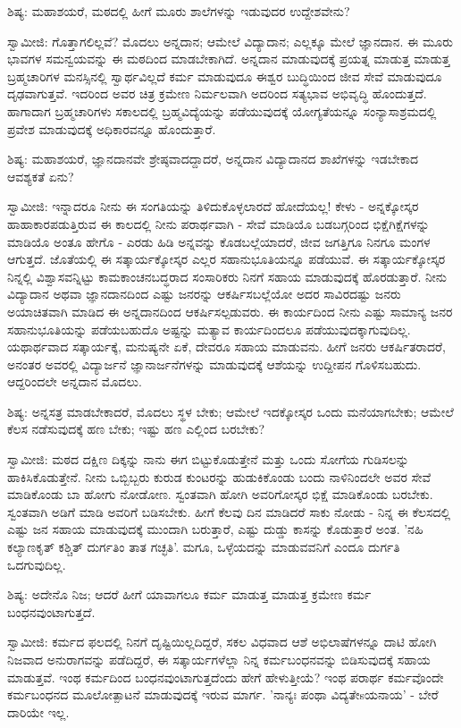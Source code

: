 ಶಿಷ್ಯ: ಮಹಾಶಯರೆ, ಮಠದಲ್ಲಿ ಹೀಗೆ ಮೂರು ಶಾಲೆಗಳನ್ನು ಇಡುವುದರ ಉದ್ದೇಶವೇನು?

ಸ್ವಾಮೀಜಿ: ಗೊತ್ತಾಗಲಿಲ್ಲವೆ? ಮೊದಲು ಅನ್ನದಾನ; ಆಮೇಲೆ ವಿದ್ಯಾದಾನ; ಎಲ್ಲಕ್ಕೂ ಮೇಲೆ ಜ್ಞಾನದಾನ. ಈ ಮೂರು ಭಾವಗಳ ಸಮನ್ವಯವನ್ನು ಈ ಮಠದಿಂದ ಮಾಡಬೇಕಾಗಿದೆ. ಅನ್ನದಾನ ಮಾಡುವುದಕ್ಕೆ ಪ್ರಯತ್ನ ಮಾಡುತ್ತ ಮಾಡುತ್ತ ಬ್ರಹ್ಮಚಾರಿಗಳ ಮನಸ್ಸಿನಲ್ಲಿ ಸ್ವಾರ್ಥವಿಲ್ಲದೆ ಕರ್ಮ ಮಾಡುವುದೂ ಈಶ್ವರ ಬುದ್ಧಿಯಿಂದ ಜೀವ ಸೇವೆ ಮಾಡುವುದೂ ದೃಢವಾಗುತ್ತವೆ. ಇದರಿಂದ ಅವರ ಚಿತ್ರ ಕ್ರಮೇಣ ನಿರ್ಮಲವಾಗಿ ಅದರಿಂದ ಸತ್ಯಭಾವ ಅಭಿವೃದ್ಧಿ ಹೊಂದುತ್ತದೆ. ಹಾಗಾದಾಗ ಬ್ರಹ್ಮಚಾರಿಗಳು ಸಕಾಲದಲ್ಲಿ ಬ್ರಹ್ಮವಿದ್ಯೆಯನ್ನು ಪಡೆಯುವುದಕ್ಕೆ ಯೋಗ್ಯತೆಯನ್ನೂ ಸಂನ್ಯಾಸಾಶ್ರಮದಲ್ಲಿ ಪ್ರವೇಶ ಮಾಡುವುದಕ್ಕೆ ಅಧಿಕಾರವನ್ನೂ ಹೊಂದುತ್ತಾರೆ.

ಶಿಷ್ಯ: ಮಹಾಶಯರೆ, ಜ್ಞಾನದಾನವೇ ಶ್ರೇಷ್ಠವಾದದ್ದಾದರೆ, ಅನ್ನದಾನ ವಿದ್ಯಾದಾನದ ಶಾಖೆಗಳನ್ನು ಇಡಬೇಕಾದ ಆವಶ್ಯಕತೆ ಏನು?

ಸ್ವಾಮೀಜಿ: ಇನ್ನಾದರೂ ನೀನು ಈ ಸಂಗತಿಯನ್ನು ತಿಳಿದುಕೊಳ್ಳಲಾರದೆ ಹೋದೆಯಲ್ಲ! ಕೇಳು - ಅನ್ನಕ್ಕೋಸ್ಕರ ಹಾಹಾಕಾರಪಡುತ್ತಿರುವ ಈ ಕಾಲದಲ್ಲಿ ನೀನು ಪರಾರ್ಥವಾಗಿ - ಸೇವೆ ಮಾಡಿಯೊ ಬಡಬಗ್ಗರಿಂದ ಭಿಕ್ಷೆಗಿಕ್ಷೆಗಳನ್ನು ಮಾಡಿಯೊ ಅಂತೂ ಹೇಗೊ - ಎರಡು ಹಿಡಿ ಅನ್ನವನ್ನು ಕೊಡಬಲ್ಲೆಯಾದರೆ, ಜೀವ ಜಗತ್ತಿಗೂ ನಿನಗೂ ಮಂಗಳ ಆಗುತ್ತದೆ. ಜೊತೆಯಲ್ಲಿ ಈ ಸತ್ಕಾರ್ಯಕ್ಕೋಸ್ಕರ ಎಲ್ಲರ ಸಹಾನುಭೂತಿಯನ್ನೂ ಪಡೆಯುವೆ. ಈ ಸತ್ಕಾರ್ಯಕ್ಕೋಸ್ಕರ ನಿನ್ನಲ್ಲಿ ವಿಶ್ವಾಸವನ್ನಿಟ್ಟು ಕಾಮಕಾಂಚನಬದ್ಧರಾದ ಸಂಸಾರಿಕರು ನಿನಗೆ ಸಹಾಯ ಮಾಡುವುದಕ್ಕೆ ಹೊರಡುತ್ತಾರೆ. ನೀನು ವಿದ್ಯಾದಾನ ಅಥವಾ ಜ್ಞಾನದಾನದಿಂದ ಎಷ್ಟು ಜನರನ್ನು ಆಕರ್ಷಿಸಬಲ್ಲೆಯೋ ಅದರ ಸಾವಿರದಷ್ಟು ಜನರು ಅಯಾಚಿತವಾಗಿ ಮಾಡಿದ ಈ ಅನ್ನದಾನದಿಂದ ಆಕರ್ಷಿಸಲ್ಪಡುವರು. ಈ ಕಾರ್ಯದಿಂದ ನೀನು ಎಷ್ಟು ಸಾಮಾನ್ಯ ಜನರ ಸಹಾನುಭೂತಿಯನ್ನು ಪಡೆಯಬಹುದೊ ಅಷ್ಟನ್ನು ಮತ್ಯಾವ ಕಾರ್ಯದಿಂದಲೂ ಪಡೆಯುವುದಕ್ಕಾಗುವುದಿಲ್ಲ. ಯಥಾರ್ಥವಾದ ಸತ್ಕಾರ್ಯಕ್ಕೆ, ಮನುಷ್ಯನೇ ಏಕೆ, ದೇವರೂ ಸಹಾಯ ಮಾಡುವನು. ಹೀಗೆ ಜನರು ಆಕರ್ಷಿತರಾದರೆ, ಅನಂತರ ಅವರಲ್ಲಿ ವಿದ್ಯಾರ್ಜನೆ ಜ್ಞಾನಾರ್ಜನೆಗಳನ್ನು ಮಾಡುವುದಕ್ಕೆ ಆಶೆಯನ್ನು ಉದ್ದೀಪನ ಗೊಳಿಸಬಹುದು. ಆದ್ದರಿಂದಲೇ ಅನ್ನದಾನ ಮೊದಲು.

ಶಿಷ್ಯ: ಅನ್ನಸತ್ರ ಮಾಡಬೇಕಾದರೆ, ಮೊದಲು ಸ್ಥಳ ಬೇಕು; ಆಮೇಲೆ ಇದಕ್ಕೋಸ್ಕರ ಒಂದು ಮನೆಯಾಗಬೇಕು; ಆಮೇಲೆ ಕೆಲಸ ನಡೆಸುವುದಕ್ಕೆ ಹಣ ಬೇಕು; ಇಷ್ಟು ಹಣ ಎಲ್ಲಿಂದ ಬರಬೇಕು?

ಸ್ವಾಮೀಜಿ: ಮಠದ ದಕ್ಷಿಣ ದಿಕ್ಕನ್ನು ನಾನು ಈಗ ಬಿಟ್ಟುಕೊಡುತ್ತೇನೆ ಮತ್ತು ಒಂದು ಸೋಗೆಯ ಗುಡಿಸಲನ್ನು ಹಾಕಿಸಿಕೊಡುತ್ತೇನೆ. ನೀನು ಒಬ್ಬಿಬ್ಬರು ಕುರುಡ ಕುಂಟರನ್ನು ಹುಡುಕಿಕೊಂಡು ಬಂದು ನಾಳಿನಿಂದಲೇ ಅವರ ಸೇವೆ ಮಾಡಿಕೊಂಡು ಬಾ ಹೋಗು ನೋಡೋಣ. ಸ್ವಂತವಾಗಿ ಹೋಗಿ ಅವರಿಗೋಸ್ಕರ ಭಿಕ್ಷೆ ಮಾಡಿಕೊಂಡು ಬರಬೇಕು. ಸ್ವಂತವಾಗಿ ಅಡಿಗೆ ಮಾಡಿ ಅವರಿಗೆ ಬಡಿಸಬೇಕು. ಹೀಗೆ ಕೆಲವು ದಿನ ಮಾಡಿದರೆ ಸಾಕು ನೋಡು - ನಿನ್ನ ಈ ಕೆಲಸದಲ್ಲಿ ಎಷ್ಟು ಜನ ಸಹಾಯ ಮಾಡುವುದಕ್ಕೆ ಮುಂದಾಗಿ ಬರುತ್ತಾರೆ, ಎಷ್ಟು ದುಡ್ಡು ಕಾಸನ್ನು ಕೊಡುತ್ತಾರೆ ಅಂತ. 'ನಹಿ ಕಲ್ಯಾಣಕೃತ್ ಕಶ್ಚಿತ್ ದುರ್ಗತಿಂ ತಾತ ಗಚ್ಛತಿ'. ಮಗೂ, ಒಳ್ಳೆಯದನ್ನು ಮಾಡುವವನಿಗೆ ಎಂದೂ ದುರ್ಗತಿ ಒದಗುವುದಿಲ್ಲ.

ಶಿಷ್ಯ: ಅದೇನೊ ನಿಜ; ಆದರೆ ಹೀಗೆ ಯಾವಾಗಲೂ ಕರ್ಮ ಮಾಡುತ್ತ ಮಾಡುತ್ತ ಕ್ರಮೇಣ ಕರ್ಮ ಬಂಧನವುಂಟಾಗುತ್ತದೆ.

ಸ್ವಾಮೀಜಿ: ಕರ್ಮದ ಫಲದಲ್ಲಿ ನಿನಗೆ ದೃಷ್ಟಿಯಿಲ್ಲದಿದ್ದರೆ, ಸಕಲ ವಿಧವಾದ ಆಶೆ ಅಭಿಲಾಷೆಗಳನ್ನೂ ದಾಟಿ ಹೋಗಿ ನಿಜವಾದ ಅನುರಾಗವನ್ನು ಪಡೆದಿದ್ದರೆ, ಈ ಸತ್ಕಾರ್ಯಗಳೆಲ್ಲಾ ನಿನ್ನ ಕರ್ಮಬಂಧನವನ್ನು ಬಿಡಿಸುವುದಕ್ಕೆ ಸಹಾಯ ಮಾಡುತ್ತವೆ. ಇಂಥ ಕರ್ಮದಿಂದ ಬಂಧನವುಂಟಾಗುತ್ತದೆಂದು ಹೇಗೆ ಹೇಳುತ್ತೀಯೆ? ಇಂಥ ಪರಾರ್ಥ ಕರ್ಮವೊಂದೇ ಕರ್ಮಬಂಧನದ ಮೂಲೋತ್ಪಾಟನೆ ಮಾಡುವುದಕ್ಕೆ ಇರುವ ಮಾರ್ಗ. 'ನಾನ್ಯಃ ಪಂಥಾ ವಿದ್ಯತೇsಯನಾಯ' - ಬೇರೆ ದಾರಿಯೇ ಇಲ್ಲ.

